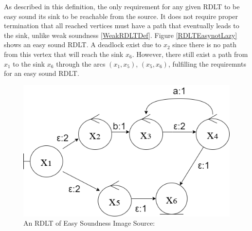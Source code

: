 As described in this definition, the only requirement for any given RDLT to be easy sound its sink to be reachable from the source. It does not require proper termination that all reached vertices must have a path that eventually leads to the sink, unlike weak soundness \ref{WeakRDLTDef}. Figure \ref{RDLTEasynotLazy} shows an easy sound RDLT. A deadlock exist due to $x_2$ since there is no path from this vertex that will reach the sink $x_6$. However, there still exist a path from $x_1$ to the sink $x_6$ through the arcs $(x_1,x_5)$, $(x_5,x_6)$, fulfilling the requiremnts for an easy sound RDLT.

\begin{figure}[H]
    \centering
    \includegraphics[width=12cm]{../figures/RDLT Easy.png}
    \caption{An RDLT of Easy Soundness Image Source: \cite{Ramirez2024}}
    \label{RDLTEasy}
\end{figure}

